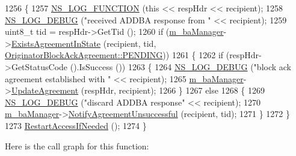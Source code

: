 \begin{DoxyCode}
1256 \{
1257   \hyperlink{log-macros-disabled_8h_a90b90d5bad1f39cb1b64923ea94c0761}{NS\_LOG\_FUNCTION} (\textcolor{keyword}{this} << respHdr << recipient);
1258   \hyperlink{group__logging_ga413f1886406d49f59a6a0a89b77b4d0a}{NS\_LOG\_DEBUG} (\textcolor{stringliteral}{"received ADDBA response from "} << recipient);
1259   uint8\_t tid = respHdr->GetTid ();
1260   \textcolor{keywordflow}{if} (\hyperlink{classns3_1_1EdcaTxopN_a7a79eaafe03995bb274451aa752b83b2}{m\_baManager}->\hyperlink{classns3_1_1BlockAckManager_ae13c4678f75ebfda7f63d0521878662b}{ExistsAgreementInState} (recipient, tid, 
      \hyperlink{classns3_1_1OriginatorBlockAckAgreement_ab33ae8af8c458aca7437a472778e4761a0f8c3879c3167ef79a0d4c57ac6015ff}{OriginatorBlockAckAgreement::PENDING}))
1261     \{
1262       \textcolor{keywordflow}{if} (respHdr->GetStatusCode ().IsSuccess ())
1263         \{
1264           \hyperlink{group__logging_ga413f1886406d49f59a6a0a89b77b4d0a}{NS\_LOG\_DEBUG} (\textcolor{stringliteral}{"block ack agreement established with "} << recipient);
1265           \hyperlink{classns3_1_1EdcaTxopN_a7a79eaafe03995bb274451aa752b83b2}{m\_baManager}->\hyperlink{classns3_1_1BlockAckManager_ac5b719210486783186579641e599d362}{UpdateAgreement} (respHdr, recipient);
1266         \}
1267       \textcolor{keywordflow}{else}
1268         \{
1269           \hyperlink{group__logging_ga413f1886406d49f59a6a0a89b77b4d0a}{NS\_LOG\_DEBUG} (\textcolor{stringliteral}{"discard ADDBA response"} << recipient);
1270           \hyperlink{classns3_1_1EdcaTxopN_a7a79eaafe03995bb274451aa752b83b2}{m\_baManager}->\hyperlink{classns3_1_1BlockAckManager_a1bc61922d4b8fbca906162e1f5a908af}{NotifyAgreementUnsuccessful} (recipient, tid);
1271         \}
1272     \}
1273   \hyperlink{classns3_1_1EdcaTxopN_a83b65be22340dc3f27d08a453cf3831f}{RestartAccessIfNeeded} ();
1274 \}
\end{DoxyCode}


Here is the call graph for this function\+:


